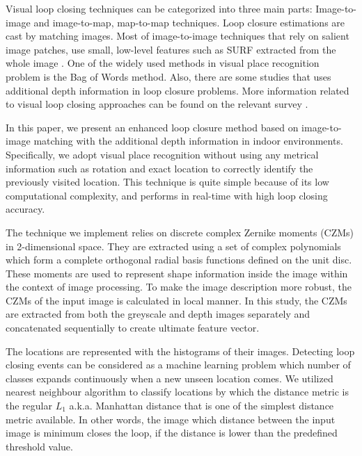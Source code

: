 \documentclass[]{spie}  %
\begin{document}
Visual loop closing techniques can be categorized into three main parts\cite{Williams09}: Image-to-image and image-to-map, map-to-map techniques. Loop closure estimations\cite{sariyanidi_spie13}  are cast by matching images. Most of image-to-image techniques that rely on salient image patches, use small, low-level features such as SURF\cite{springerlink:10.1007/11744023_32} extracted from the whole image \cite{sariyanidi_iv, HoNewmanCIRA2005, CumminsNewmanIJRR08}. One of the widely used methods in visual place recognition problem is the Bag of Words\cite{1238663} method. Also, there are some studies that uses additional depth information\cite{kerl2013-IROS} in loop closure problems. More information related to visual loop closing approaches can be found on the relevant survey \cite{Williams09}.

In this paper, we present an enhanced loop closure method based on image-to-image matching with the additional depth information in indoor environments. Specifically, we adopt visual place recognition without using any metrical information such as rotation and exact location to correctly identify the previously visited location. This technique is quite simple because of its low computational complexity, and performs in real-time with high loop closing accuracy. 

The technique we implement relies on discrete complex Zernike moments (CZMs) in 2-dimensional space. They are extracted using a set of complex polynomials which form a complete orthogonal radial basis functions defined on the unit disc. These moments are used to represent shape information inside the image within the context of image processing. To make the image description more robust, the CZMs of the input image is calculated in local manner. In this study, the CZMs are extracted from both the greyscale and depth images separately and concatenated sequentially to create ultimate feature vector.

The locations are represented with the histograms of their images. Detecting loop closing events can be considered as a machine learning problem which number of classes expands continuously when a new unseen location comes. We utilized nearest neighbour algorithm to classify locations by which the distance metric is the regular $L_1$ a.k.a. Manhattan distance that is one of the simplest distance metric available. In other words, the image which distance between the input image is minimum closes the loop, if the distance is lower than the predefined threshold value. 
\end{document}
